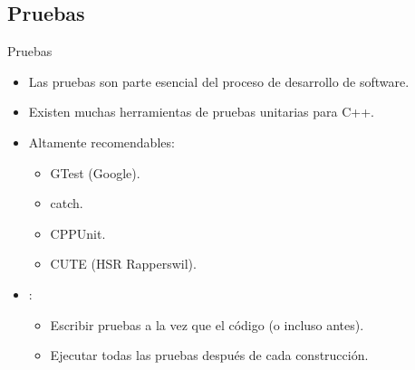 \subsection{Pruebas}

\begin{frame}[t]{Pruebas}
\begin{itemize}
  \item Las pruebas son parte esencial del proceso de desarrollo de software.
  \item Existen muchas herramientas de pruebas unitarias para C++.
  \item Altamente recomendables:
    \begin{itemize}
      \item GTest (Google).
      \item catch.
      \item CPPUnit.
      \item CUTE (HSR Rapperswil).
    \end{itemize}

  \item {}:
    \begin{itemize}
      \item Escribir pruebas a la vez que el código (o incluso antes).
      \item Ejecutar todas las pruebas después de cada construcción.
    \end{itemize}
\end{itemize}
\end{frame}

